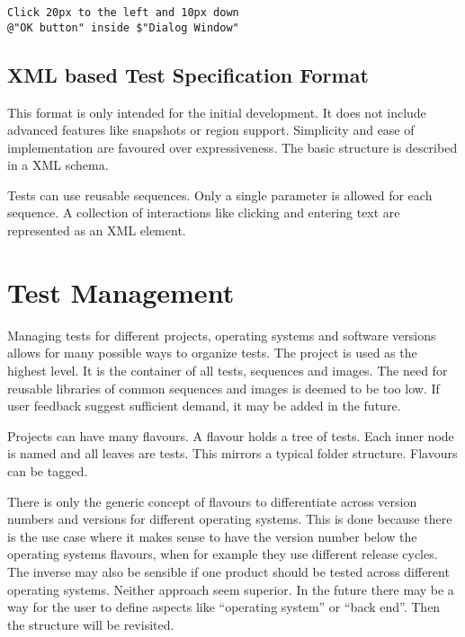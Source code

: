 \documentclass[a4paper,twocolumn]{article}
\begin{document}
\renewcommand{\lstlistingname}{Example}
\begin{lstlisting}[language=Pseudo,caption={Example for possible syntax},label={lst:SyntaxExample}]
Click 20px to the left and 10px down 
@"OK button" inside $"Dialog Window"
\end{lstlisting}

\subsection{XML based Test Specification Format}
This format is only intended for the initial development.
It does not include advanced features like snapshots or region support.
Simplicity and ease of implementation are favoured over expressiveness.
The basic structure is described in a XML schema.

Tests can use reusable sequences.
Only a single parameter is allowed for each sequence.
A collection of interactions like clicking and entering text are represented as an XML element.

\section{Test Management}
Managing tests for different projects, operating systems and software versions allows for many possible ways to organize tests.
The project is used as the highest level.
It is the container of all tests, sequences and images.
The need for reusable libraries of common sequences and images is deemed to be too low.
If user feedback suggest sufficient demand, it may be added in the future.

Projects can have many flavours.
A flavour holds a tree of tests.
Each inner node is named and all leaves are tests.
This mirrors a typical folder structure.
Flavours can be tagged.

There is only the generic concept of flavours to differentiate across version numbers and versions for different operating systems.
This is done because there is the use case where it makes sense to have the version number below the operating systems flavours, when for example they use different release cycles.
The inverse may also be sensible if one product should be tested across different operating systems.
Neither approach seem superior.
In the future there may be a way for the user to define aspects like \enquote{operating system} or \enquote{back end}. Then the structure will be revisited.
\end{document}
